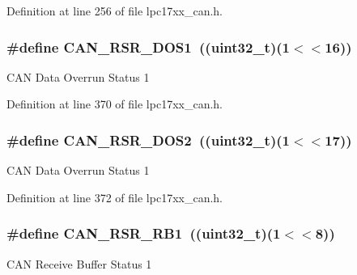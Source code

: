 \-Definition at line 256 of file lpc17xx\-\_\-can.\-h.

\hypertarget{group___c_a_n___private___macros_gacae52bd8e9523dac3a1c45460e9a4473}{
\subsubsection[{\-C\-A\-N\-\_\-\-R\-S\-R\-\_\-\-D\-O\-S1}]{\setlength{\rightskip}{0pt plus 5cm}\#define {\bf \-C\-A\-N\-\_\-\-R\-S\-R\-\_\-\-D\-O\-S1}~((uint32\-\_\-t)(1$<$$<$16))}}\label{group___c_a_n___private___macros_gacae52bd8e9523dac3a1c45460e9a4473}
\-C\-A\-N \-Data \-Overrun \-Status 1 

\-Definition at line 370 of file lpc17xx\-\_\-can.\-h.

\hypertarget{group___c_a_n___private___macros_ga958438c2212191108845c719d2fbbf6c}{
\subsubsection[{\-C\-A\-N\-\_\-\-R\-S\-R\-\_\-\-D\-O\-S2}]{\setlength{\rightskip}{0pt plus 5cm}\#define {\bf \-C\-A\-N\-\_\-\-R\-S\-R\-\_\-\-D\-O\-S2}~((uint32\-\_\-t)(1$<$$<$17))}}\label{group___c_a_n___private___macros_ga958438c2212191108845c719d2fbbf6c}
\-C\-A\-N \-Data \-Overrun \-Status 1 

\-Definition at line 372 of file lpc17xx\-\_\-can.\-h.

\hypertarget{group___c_a_n___private___macros_gab805c971503c3ad9c468dd74037f767e}{
\subsubsection[{\-C\-A\-N\-\_\-\-R\-S\-R\-\_\-\-R\-B1}]{\setlength{\rightskip}{0pt plus 5cm}\#define {\bf \-C\-A\-N\-\_\-\-R\-S\-R\-\_\-\-R\-B1}~((uint32\-\_\-t)(1$<$$<$8))}}\label{group___c_a_n___private___macros_gab805c971503c3ad9c468dd74037f767e}
\-C\-A\-N \-Receive \-Buffer \-Status 1 

